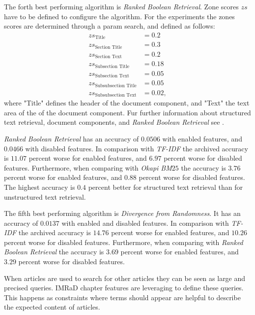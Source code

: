 The forth best performing algorithm is \textit{Ranked Boolean Retrieval}. Zone scores $zs$ have to be defined to configure the algorithm. For the experiments the zones scores are determined through a param search, and defined as follows:
\begin{align*}
  zs_{\text{Title}} & = 0.2                \nonumber \\
  zs_{\text{Section Title}} & = 0.3        \nonumber \\
  zs_{\text{Section Text}} & = 0.2         \nonumber \\
  zs_{\text{Subsection Title}} & = 0.18    \nonumber \\
  zs_{\text{Subsection Text}} & = 0.05     \nonumber \\
  zs_{\text{Subsubsection Title}} & =0.05  \nonumber \\
  zs_{\text{Subsubsection Text}} & = 0.02, \nonumber
\end{align*}
where "Title" defines the header of the document component, and "Text" the text area of the of the document component. Fur further information about structured text retrieval, document components, and \textit{Ranked Boolean Retrieval} see . 

\textit{Ranked Boolean Retrieval} has an accuracy of $0.0506$ with enabled features, and $0.0466$ with disabled features. In comparison with \textit{TF-IDF} the archived accuracy is $11.07$ percent worse for enabled features, and $6.97$ percent worse for disabled features. Furthermore, when comparing with \textit{Okapi BM$25$} the accuracy is $3.76$ percent worse for enabled features, and $0.88$ percent worse for disabled features. The highest accuracy is $0.4$ percent better for structured text retrieval than for unstructured text retrieval.

The fifth best performing algorithm is \textit{Divergence from Randomness}. It has an accuracy of $0.0137$ with enabled and disabled features. In comparison with \textit{TF-IDF} the archived accuracy is $14.76$ percent worse for enabled features, and $10.26$ percent worse for disabled features. Furthermore, when comparing with \textit{Ranked Boolean Retrieval} the accuracy is $3.69$ percent worse for enabled features, and $3.29$ percent worse for disabled features. 

When articles are used to search for other articles they can be seen as large and precised queries. IMRaD chapter features are leveraging to define these queries. This happens as constraints where terms should appear are helpful to describe the expected content of articles.

